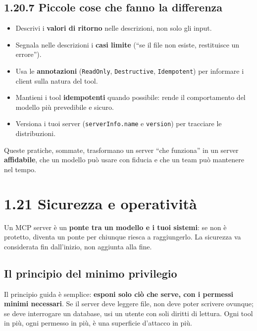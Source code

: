 \documentclass[
  italian,
  10pt,
]{book}
\providecommand{\tightlist}{%
  \setlength{\itemsep}{0pt}\setlength{\parskip}{0pt}}
\begin{document}
\subsection{1.20.7 Piccole cose che fanno la
differenza}\label{piccole-cose-che-fanno-la-differenza}

\begin{itemize}
\tightlist
\item
  Descrivi i \textbf{valori di ritorno} nelle descrizioni, non solo gli
  input.
\item
  Segnala nelle descrizioni i \textbf{casi limite} (``se il file non
  esiste, restituisce un errore'').
\item
  Usa le \textbf{annotazioni} (\texttt{ReadOnly}, \texttt{Destructive},
  \texttt{Idempotent}) per informare i client sulla natura del tool.
\item
  Mantieni i tool \textbf{idempotenti} quando possibile: rende il
  comportamento del modello più prevedibile e sicuro.
\item
  Versiona i tuoi server (\texttt{serverInfo.name} e \texttt{version})
  per tracciare le distribuzioni.
\end{itemize}

Queste pratiche, sommate, trasformano un server ``che funziona'' in un
server \textbf{affidabile}, che un modello può usare con fiducia e che
un team può mantenere nel tempo.

\section{1.21 Sicurezza e operatività}\label{sicurezza-e-operativituxe0}

Un MCP server è un \textbf{ponte tra un modello e i tuoi sistemi}: se
non è protetto, diventa un ponte per chiunque riesca a raggiungerlo. La
sicurezza va considerata fin dall'inizio, non aggiunta alla fine.

\subsection{Il principio del minimo
privilegio}\label{il-principio-del-minimo-privilegio}

Il principio guida è semplice: \textbf{esponi solo ciò che serve, con i
permessi minimi necessari}. Se il server deve leggere file, non deve
poter scrivere ovunque; se deve interrogare un database, usi un utente
con soli diritti di lettura. Ogni tool in più, ogni permesso in più, è
una superficie d'attacco in più.
\end{document}
